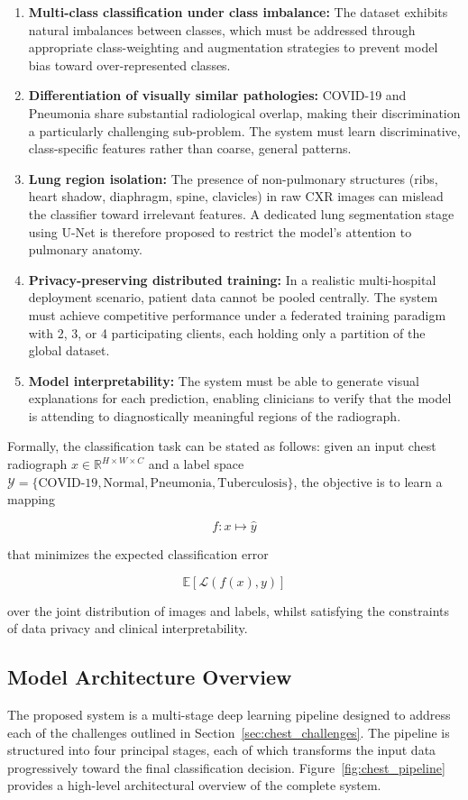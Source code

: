\begin{enumerate}
	\item \textbf{Multi-class classification under class imbalance:} The dataset exhibits natural imbalances between classes, which must be addressed through appropriate class-weighting and augmentation strategies to prevent model bias toward over-represented classes.
	\item \textbf{Differentiation of visually similar pathologies:} COVID-19 and Pneumonia share substantial radiological overlap, making their discrimination a particularly challenging sub-problem. The system must learn discriminative, class-specific features rather than coarse, general patterns.
	\item \textbf{Lung region isolation: }The presence of non-pulmonary structures (ribs, heart shadow, diaphragm, spine, clavicles) in raw CXR images can mislead the classifier toward irrelevant features. A dedicated lung segmentation stage using U-Net is therefore proposed to restrict the model's attention to pulmonary anatomy.
	\item \textbf{Privacy-preserving distributed training: } In a realistic multi-hospital deployment scenario, patient data cannot be pooled centrally. The system must achieve competitive performance under a federated training paradigm with 2, 3, or 4 participating clients, each holding only a partition of the global dataset.
	\item \textbf{Model interpretability:} The system must be able to generate visual explanations for each prediction, enabling clinicians to verify that the model is attending to diagnostically meaningful regions of the radiograph.
\end{enumerate}
Formally, the classification task can be stated as follows: given an input chest radiograph 
$x \in \mathbb{R}^{H \times W \times C}$ and a label space 
$\mathcal{Y} = \{\text{COVID-19}, \text{Normal}, \text{Pneumonia}, \text{Tuberculosis}\}$, 
the objective is to learn a mapping

\[
f : x \mapsto \hat{y}
\]

that minimizes the expected classification error

\[
\mathbb{E}\left[\mathcal{L}(f(x), y)\right]
\]

over the joint distribution of images and labels, whilst satisfying the constraints of data privacy and clinical interpretability.

\subsection{Model Architecture Overview}
The proposed system is a multi-stage deep learning pipeline designed to address each of the challenges outlined in Section~\ref{sec:chest_challenges}. The pipeline is structured into four principal stages, each of which transforms the input data progressively toward the final classification decision. Figure~\ref{fig:chest_pipeline} provides a high-level architectural overview of the complete system.

